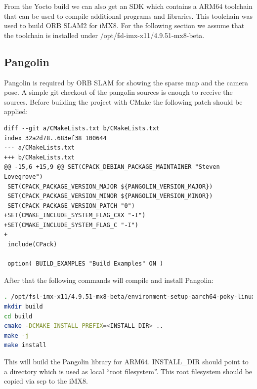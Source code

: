 \documentclass[11pt,a4paper,titlepage,oneside]{report}
\begin{document}
From the Yocto build we can also get an SDK which contains a ARM64 toolchain that can be used to compile additional programs and libraries. This toolchain was used to build ORB SLAM2 for iMX8. For the following section we assume that the toolchain is installed under /opt/fsl-imx-x11/4.9.51-mx8-beta.

\subsection{Pangolin}
Pangolin \cite{pangolin} is required by ORB SLAM for showing the sparse map and the camera pose. A simple git checkout of the pangolin sources is enough to receive the sources. Before building the project with CMake the following patch should be applied:
\begin{lstlisting}
diff --git a/CMakeLists.txt b/CMakeLists.txt
index 32a2d78..683ef38 100644
--- a/CMakeLists.txt
+++ b/CMakeLists.txt
@@ -15,6 +15,9 @@ SET(CPACK_DEBIAN_PACKAGE_MAINTAINER "Steven Lovegrove")
 SET(CPACK_PACKAGE_VERSION_MAJOR ${PANGOLIN_VERSION_MAJOR})
 SET(CPACK_PACKAGE_VERSION_MINOR ${PANGOLIN_VERSION_MINOR})
 SET(CPACK_PACKAGE_VERSION_PATCH "0")
+SET(CMAKE_INCLUDE_SYSTEM_FLAG_CXX "-I")
+SET(CMAKE_INCLUDE_SYSTEM_FLAG_C "-I")
+
 include(CPack)
 
 option( BUILD_EXAMPLES "Build Examples" ON )
\end{lstlisting}

After that the following commands will compile and install Pangolin:
\begin{lstlisting}[language=bash]
. /opt/fsl-imx-x11/4.9.51-mx8-beta/environment-setup-aarch64-poky-linux
mkdir build
cd build
cmake -DCMAKE_INSTALL_PREFIX=<INSTALL_DIR> ..
make -j
make install
\end{lstlisting}

This will build the Pangolin library for ARM64. INSTALL\_DIR should point to a directory which is used as local ``root filesystem''. This root filesystem should be copied via scp to the iMX8.
\end{document}

